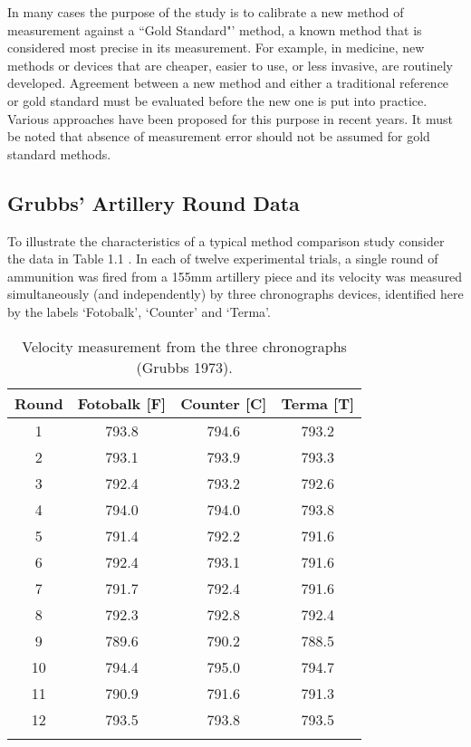 \documentclass[12pt, a4paper]{report}
\theoremstyle{plain}
\theoremstyle{definition}
\theoremstyle{remark}
\begin{document}
In many cases the purpose of the study is to calibrate a new method of measurement against a ``Gold Standard"’ method, a known method that is considered most precise in its measurement. For example, in medicine, new methods or devices that are cheaper, easier to use, or less invasive, are routinely developed. Agreement between a new method and either a traditional reference or gold standard must be evaluated before the new one is put into practice. Various approaches have been proposed for this purpose in recent years. It must be noted that absence of measurement error should not be assumed for gold standard methods.
	
	
\subsection{Grubbs' Artillery Round Data}	

	To illustrate the characteristics of a typical method comparison
	study consider the data in Table 1.1 \citep{Grubbs73}. In each of
	twelve experimental trials, a single round of ammunition was fired
	from a 155mm artillery piece and its velocity was measured simultaneously (and
	independently) by three chronographs devices, identified here by
	the labels `Fotobalk', `Counter' and `Terma'.
	\smallskip
	\begin{table}[ht]
		\begin{center}
			\begin{tabular}{|c|c|c|c|}
				\hline
				Round& Fotobalk [F] & Counter [C]& Terma [T]\\
				\hline
				1 & 793.8 & 794.6 & 793.2 \\
				2 & 793.1 & 793.9 & 793.3 \\
				3 & 792.4 & 793.2 & 792.6 \\
				4 & 794.0 & 794.0 & 793.8 \\
				5 & 791.4 & 792.2 & 791.6 \\
				6 & 792.4 & 793.1 & 791.6 \\
				7 & 791.7 & 792.4 & 791.6 \\
				8 & 792.3 & 792.8 & 792.4 \\
				9 & 789.6 & 790.2 & 788.5 \\
				10 & 794.4 & 795.0 & 794.7 \\
				11 & 790.9 & 791.6 & 791.3 \\
				12 & 793.5 & 793.8 & 793.5 \\
			\phantom{makespace} & \phantom{makespace} & \phantom{makespace} & \phantom{makespace} \\ \hline 
			\end{tabular}
			\caption{Velocity measurement from the three chronographs (Grubbs
				1973).}
		\end{center}
		\label{FCTdata}
	\end{table}
	
\end{document}
